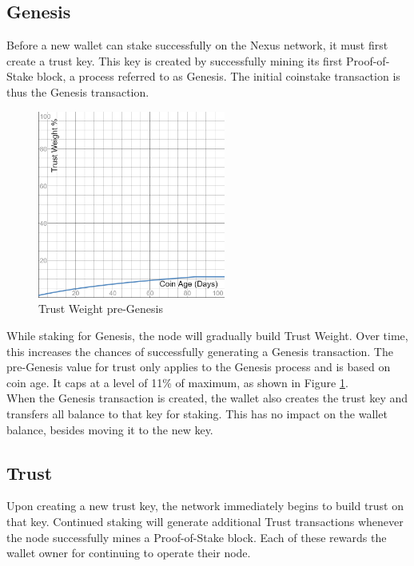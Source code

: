 \documentclass[11pt]{article}
\begin{document}
\subsection{Genesis}
Before a new wallet can stake successfully on the Nexus network, it must first create a trust key. This key is created by successfully mining its first 
Proof-of-Stake block, a process referred to as Genesis. The initial coinstake transaction is thus the Genesis transaction. \\

\begin{figure}
    \centering
    \includegraphics[width=0.55\textwidth]{images/preGenesisTrustWeight.png}
    \caption{Trust Weight pre-Genesis \label{fig:preGenesisTrust}}
\end{figure}

\noindent While staking for Genesis, the node will gradually build Trust Weight. Over time, this increases the chances of successfully generating a Genesis transaction. The pre-Genesis value for trust only applies to the Genesis process and is based on coin age. It caps at a level of 11\% of maximum, as shown in Figure \ref{fig:preGenesisTrust}.\\

\noindent When the Genesis transaction is created, the wallet also creates the trust key and transfers all balance to that key for staking. This has no impact on the wallet balance, besides moving it to the new key.\\

\subsection{Trust}
Upon creating a new trust key, the network immediately begins to build trust on that key. Continued staking will generate additional Trust transactions whenever the node successfully mines a Proof-of-Stake block. Each of these rewards the wallet owner for continuing to operate their node.\\
\end{document}
